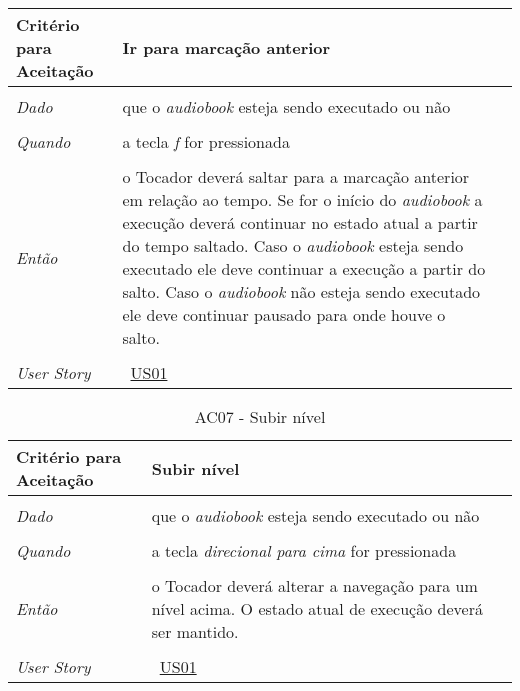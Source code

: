 \begin{apendicesenv}
\begin{table}[ht]
\begin{center}
\begin{tabularx}{\textwidth}{|lX|l|}
\hline
\textbf{Critério para Aceitação} & Ir para marcação anterior \\
\hline
 & \\
\textit{Dado} & que o \textit{audiobook} esteja sendo executado ou não \\
 & \\
\textit{Quando} & a tecla \textit{f} for pressionada \\
 & \\
\textit{Então} & o Tocador deverá saltar para a marcação anterior em relação ao tempo. Se for o início do \textit{audiobook} a execução deverá continuar no estado atual a partir do tempo saltado. Caso o \textit{audiobook} esteja sendo executado ele deve continuar a execução a partir do salto. Caso o \textit{audiobook} não esteja sendo executado ele deve continuar pausado para onde houve o salto. \\
 & \\
\hline
\textit{User Story} & ~\hyperref[tab:us01]{US01} \\
\hline

\end{tabularx}
\end{center}
\label{tab:us01a6}
\end{table}


\begin{table}[ht]
\centering
\caption{AC07 - Subir nível}
\vspace{0.1cm}
\begin{center}
\begin{tabularx}{\textwidth}{|lX|l|}

\hline
\textbf{Critério para Aceitação} & Subir nível \\
\hline
 & \\
\textit{Dado} & que o \textit{audiobook} esteja sendo executado ou não \\
 & \\
\textit{Quando} & a tecla \textit{direcional para cima} for pressionada \\
 & \\
\textit{Então} & o Tocador deverá alterar a navegação para um nível acima. O estado atual de execução deverá ser mantido. \\
 & \\
\hline
\textit{User Story} & ~\hyperref[tab:us01]{US01} \\
\hline


\end{tabularx}
\end{center}
\end{table}
\end{apendicesenv}
